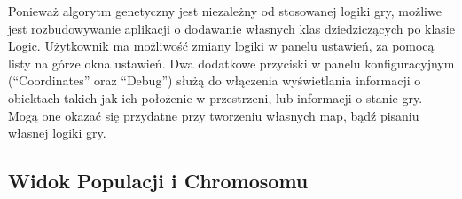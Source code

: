 \begin{par}
	\newline
	Ponieważ algorytm genetyczny jest niezależny od stosowanej logiki gry, możliwe jest rozbudowywanie aplikacji o dodawanie własnych klas dziedziczących po klasie Logic. Użytkownik ma możliwość zmiany logiki w panelu ustawień, za pomocą listy na górze okna ustawień.
	Dwa dodatkowe przyciski w panelu konfiguracyjnym (``Coordinates'' oraz ``Debug'') służą do włączenia wyświetlania informacji o obiektach takich jak ich położenie w przestrzeni, lub informacji o stanie gry. Mogą one okazać się przydatne przy tworzeniu własnych map, bądź pisaniu własnej logiki gry.
\end{par}
\subsection{Widok Populacji i Chromosomu}
